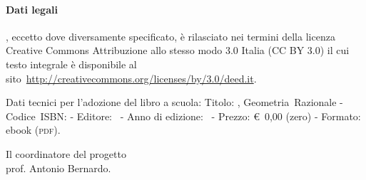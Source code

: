 \paragraph{Dati legali} \serie, eccetto dove diversamente specificato, è rilasciato nei termini 
della licenza Creative Commons Attribuzione allo stesso modo 3.0 Italia
(CC BY 3.0) il cui testo integrale è disponibile al 
sito~\url{http://creativecommons.org/licenses/by/3.0/deed.it}.

Dati tecnici per l'adozione del libro a scuola: Titolo: \serie, Geometria~Razionale - Codice~ISBN:
{\mcisbn} - Editore: \editore\ - Anno di edizione: \anno\ - Prezzo: €~0,00 (zero) - Formato:
ebook ({\scshape{pdf}}).

\begin{flushright}
Il coordinatore del progetto\\
prof. Antonio Bernardo.
\end{flushright}

\cleardoublepage
